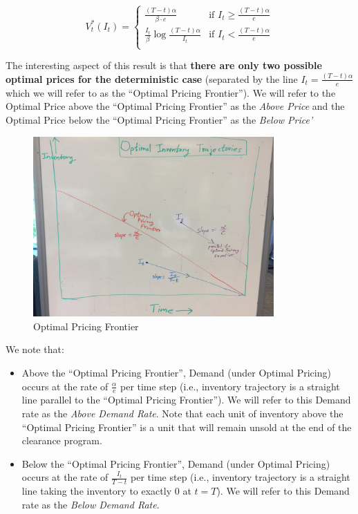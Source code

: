 \documentclass[12pt]{amsart}
\begin{document}
$$
V_t^*(I_t) = 
\begin{cases}
\frac {(T-t) \alpha} {\beta \cdot e} & \text{if } I_t \geq \frac {(T-t) \alpha} e \\
\frac {I_t} {\beta} \log{ \frac {(T-t) \alpha} {I_t}} & \text{if } I_t < \frac {(T-t) \alpha} e\\
\end{cases}
$$

The interesting aspect of this result is that {\bf there are only two possible optimal prices for the deterministic case} (separated by the line $I_t = \frac {(T-t) \alpha} e$ which we will refer to as the ``Optimal Pricing Frontier''). We will refer to the Optimal Price above the ``Optimal Pricing Frontier'' as the {\em Above Price} and the Optimal Price below the ``Optimal Pricing Frontier'' as the {\em Below Price'}

\begin{figure}[H]
  \includegraphics[width=0.82\textwidth]{frontier.jpg}
  \caption{Optimal Pricing Frontier}
\end{figure}

We note that:
\begin{itemize}
\item Above the ``Optimal Pricing Frontier'', Demand (under Optimal Pricing) occurs at the rate of $\frac \alpha e$ per time step (i.e., inventory trajectory is a straight line parallel to the ``Optimal Pricing Frontier''). We will refer to this Demand rate as the {\em Above Demand Rate}. Note that each unit of inventory above the ``Optimal Pricing Frontier'' is a unit that will remain unsold at the end of the clearance program.
\item Below the ``Optimal Pricing Frontier'', Demand (under Optimal Pricing) occurs at the rate of $\frac {I_t} {T-t}$ per time step (i.e., inventory trajectory is a straight line taking the inventory to exactly 0 at $t=T$). We will refer to this Demand rate as the {\em Below Demand Rate}.
\end{itemize}
\end{document}
